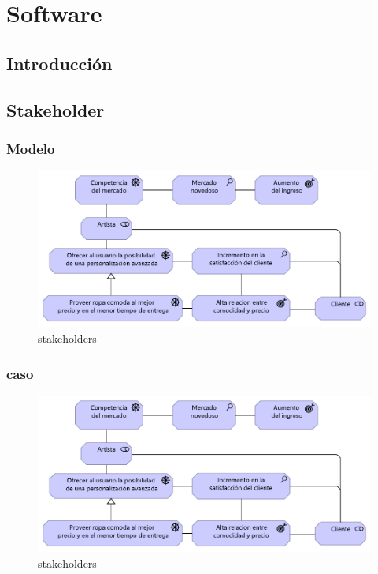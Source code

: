 \graphicspath{{./2-Arquitectura/capitulo6/}}


\chapter{Software}
\section{Introducción}
\newpage
\section{Stakeholder}
\subsection{Modelo}
\begin{figure}[h!]
	\centering
	\includegraphics[width=0.7\linewidth]{imgs/stakeholders}
	\caption{stakeholders}
	\label{fig:stakeholders}
\end{figure}
\newpage
\subsection{caso}
\begin{figure}[h!]
	\centering
	\includegraphics[width=0.7\linewidth]{imgs/stakeholders}
	\caption{stakeholders}
	\label{fig:stakeholders}
\end{figure}
\newpage